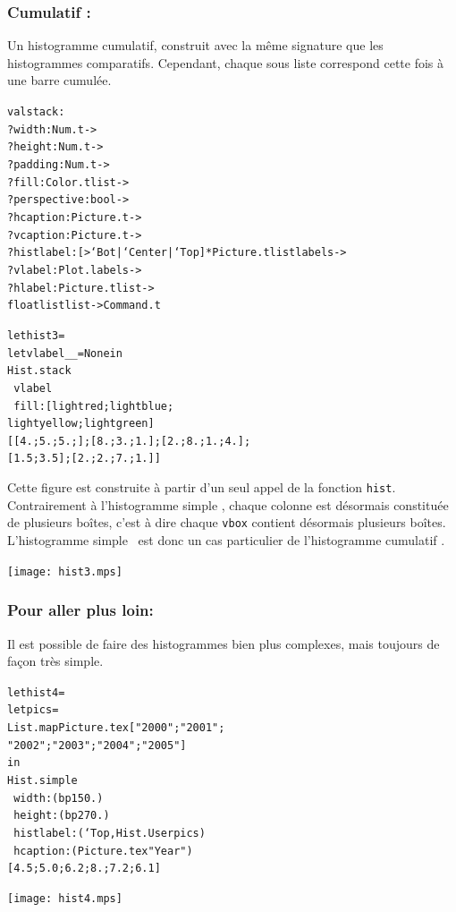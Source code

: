 \documentclass[a4paper,12pt]{article}
\begin{document}
\subsubsection{Cumulatif :} 
Un histogramme cumulatif, construit avec la même signature que les histogrammes comparatifs. Cependant, chaque sous liste correspond cette fois à une barre cumulée.
\begin{alltt}
  val stack :
  ?width:Num.t ->
  ?height:Num.t ->
  ?padding:Num.t ->
  ?fill:Color.t list ->
  ?perspective: bool ->
  ?hcaption:Picture.t ->
  ?vcaption:Picture.t ->
  ?histlabel:[> `Bot | `Center | `Top ] * Picture.t list labels ->
  ?vlabel:Plot.labels ->
  ?hlabel:Picture.t list -> 
  float list list -> Command.t
\end{alltt}

\bigskip

\begin{minipage}{0.5\linewidth}
  \begin{alltt}
    let hist3 =
    let vlabel _ _ = None in
    Hist.stack 
    ~vlabel
    ~fill:[lightred;lightblue;
      lightyellow;lightgreen]
    [[4.;5.;5.;]; [8.;3.;1.]; [2.;8.;1.;4.];
      [1.5;3.5];[2.;2.;7.;1.]]
  \end{alltt}
  
  Cette figure est construite à partir d'un seul appel de la fonction \texttt{hist}. Contrairement à l'histogramme \og simple \fg, chaque colonne est désormais constituée de plusieurs boîtes, c'est à dire chaque \texttt{vbox} contient désormais plusieurs boîtes. L'histogramme \og simple \fg\ est donc un cas particulier de l'histogramme \og cumulatif \fg.
\end{minipage}
\begin{minipage}{0.5\linewidth}
\begin{center}
\texttt{[image: hist3.mps]}
\end{center}
\end{minipage}

\subsubsection{Pour aller plus loin:}
Il est possible de faire des histogrammes bien plus complexes, mais toujours de façon très simple.

\begin{minipage}{0.5\linewidth}
  \begin{alltt}
    let hist4 =
    let pics =
    List.map Picture.tex ["2000";"2001";
      "2002";"2003";"2004";"2005"]
    in
    Hist.simple 
    ~width:(bp 150.)
    ~height:(bp 270.)
    ~histlabel:(`Top, Hist.User pics)
    ~hcaption:(Picture.tex "Year")
    [4.5;5.0;6.2;8.;7.2;6.1]
  \end{alltt}
\end{minipage}
\begin{minipage}{0.5\linewidth}
\begin{center}
\texttt{[image: hist4.mps]}
\end{center}
\end{minipage}
\end{document}
